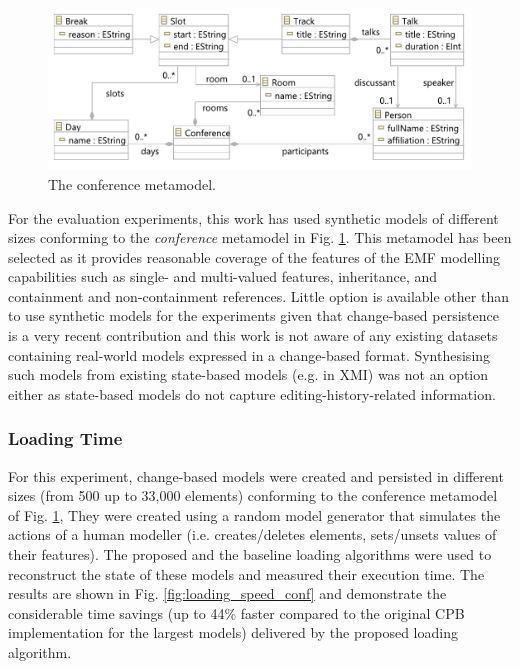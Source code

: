 \documentclass[12pt, a4paper]{report} \usepackage[titletoc]{appendix}
\begin{document}
\begin{figure}[htbp]
	\centering
	\includegraphics[width=0.9\linewidth]{conference_metamodel}
	\caption{The conference metamodel.}   
	\label{fig:node_metamodel}
\end{figure}

For the evaluation experiments, this work has used synthetic models of different sizes conforming to the \emph{conference} metamodel in Fig. \ref{fig:node_metamodel}. This metamodel has been selected as it provides reasonable coverage of the features of the EMF modelling capabilities such as single- and multi-valued features, inheritance, and containment and non-containment references. Little option is available  other than to use synthetic models for the experiments given that change-based persistence is a very recent contribution and this work is not aware of any existing datasets containing real-world models expressed in a change-based format. Synthesising such models from existing state-based models (e.g. in XMI) was not an option either as state-based models do not capture editing-history-related information.    

\subsubsection{Loading Time}
\label{subsec:loading_time_test}
For this experiment, change-based models were created and persisted in different sizes (from 500 up to 33,000 elements) conforming to the conference metamodel of Fig. \ref{fig:node_metamodel}, They were created using a random model generator that simulates the actions of a human modeller (i.e. creates/deletes elements, sets/unsets values of their features). The proposed and the baseline loading algorithms were used to reconstruct the state of these models and measured their execution time. The results are shown in Fig. \ref{fig:loading_speed_conf} and demonstrate the considerable time savings (up to 44\% faster compared to the original CPB implementation for the largest models) delivered by the proposed loading algorithm.
\end{document}
